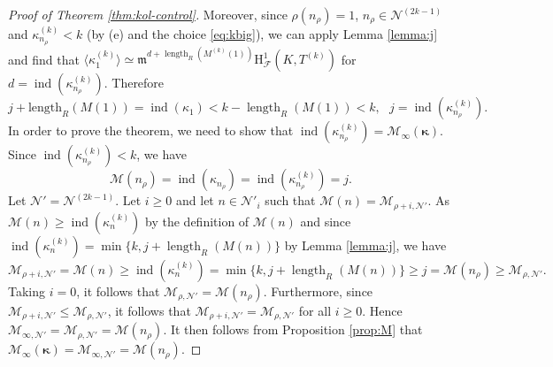\documentclass[10pt,reqno]{amsart}
\numberwithin{equation}{section}
\theoremstyle{plain}
\theoremstyle{definition}
\theoremstyle{definition}
\theoremstyle{plain}
\theoremstyle{plain}
\theoremstyle{plain}
\theoremstyle{plain}
\theoremstyle{plain}
\theoremstyle{plain}
\newcommand{\ind}{\operatorname{ind}}
\DeclareMathOperator{\length}{length}
\newcommand{\CF}{\mathcal{F}}
\newcommand{\cN}{\mathcal{N}}
\newcommand{\kap}{\kappa}
\newcommand{\fm}{\mathfrak{m}}
\newcommand{\rH}{\mathrm{H}}
\begin{document}
\begin{proof}[Proof of Theorem \ref{thm:kol-control}]
Moreover, since $\rho(n_\rho) = 1$, $n_\rho \in\mathcal{N}^{(2k-1)}$ and $\kappa^{(k)}_{n_{\rho}}<k$ (by (e) and the choice \eqref{eq:kbig}),   we can apply Lemma \ref{lemma:j} and find that $\langle \kappa_1^{(k)}\rangle \simeq \fm^{d+ \length_R (M^{(k)}(1))}\rH^1_{\CF}(K,T^{(k)})$ for $d=\ind(\kappa_{n_\rho}^{(k)})$. Therefore
\begin{equation}\label{eq:j+len}
j+\mathrm{length}_{R}(M(1))=\ind(\kappa_1) < k-\length_R(M(1)) < k, \ \ \ j = \ind(\kappa_{n_\rho}^{(k)}).
\end{equation}
In order to prove the theorem, we need to show that $\ind(\kappa_{n_\rho}^{(k)})=\mathscr{M}_{\infty}(\boldsymbol{\kappa})$.
Since $\ind(\kap_{n_\rho}^{(k)}) < k$, we have 
$$
\mathscr{M}(n_\rho) = \ind(\kap_{n_\rho}) = \ind(\kap_{n_\rho}^{(k)}) = j.
$$
Let $\cN' = \cN^{(2k-1)}$. Let $i\geq 0$ and let $n\in \cN'_i$ such that $\mathscr{M}(n) = \mathscr{M}_{\rho+i,\cN'}$.  
As $\mathscr{M}(n) \geq \ind(\kap^{(k)}_{n})$ by the definition of $\mathscr{M}(n)$ and since
$\ind(\kap^{(k)}_{n})  = \min\{k,j+\length_R(M(n))\}$ by Lemma \ref{lemma:j}, we have 
$$
\mathscr{M}_{\rho+i,\cN'} = \mathscr{M}(n) \geq \ind(\kap^{(k)}_{n}) =  \min\{k,j+\length_R(M(n))\} \geq j = \mathscr{M}(n_\rho)\geq \mathscr{M}_{\rho,\cN'}.
$$
Taking $i=0$, it follows that $\mathscr{M}_{\rho,\cN'} = \mathscr{M}(n_\rho)$.  Furthermore, since $\mathscr{M}_{\rho+i,\cN'} \leq \mathscr{M}_{\rho,\cN'}$, 
it follows that $\mathscr{M}_{\rho+i,\cN'} = \mathscr{M}_{\rho,\cN'}$ for all $i\geq 0$. Hence $\mathscr{M}_{\infty,\cN'} = \mathscr{M}_{\rho,\cN'} = \mathscr{M}(n_\rho)$. It then follows from Proposition \ref{prop:M} that
$\mathscr{M}_\infty(\boldsymbol{\kappa}) = \mathscr{M}_{\infty,\cN'} = \mathscr{M}(n_\rho)$.
\end{proof}
\end{document}
